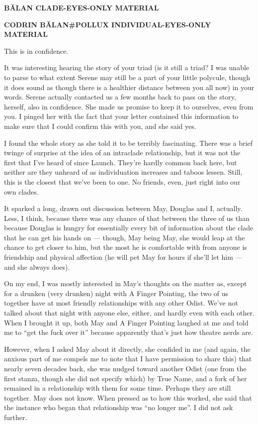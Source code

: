 \begin{center}
\textbf{BĂLAN CLADE-EYES-ONLY MATERIAL}
\end{center}

\begin{center}
\textbf{CODRIN BĂLAN\#POLLUX INDIVIDUAL-EYES-ONLY MATERIAL}
\end{center}

This is in confidence.

It was interesting hearing the story of your triad (is it still a triad? I was unable to parse to what extent Serene may still be a part of your little polycule, though it does sound as though there is a healthier distance between you all now) in your words. Serene actually contacted us a few months back to pass on the story, herself, also in confidence. She made us promise to keep it to ourselves, even from you. I pinged her with the fact that your letter contained this information to make sure that I could confirm this with you, and she said yes.

I found the whole story as she told it to be terribly fascinating. There was a brief twinge of surprise at the idea of an intraclade relationship, but it was not the first that I've heard of since Launch. They're hardly common back here, but neither are they unheard of as individuation increases and taboos lessen. Still, this is the closest that we've been to one. No friends, even, just right into our own clades.

It sparked a long, drawn out discussion between May, Douglas and I, actually. Less, I think, because there was any chance of that between the three of us than because Douglas is hungry for essentially every bit of information about the clade that he can get his hands on — though, May being May, she would leap at the chance to get closer to him, but the most he is comfortable with from anyone is friendship and physical affection (he will pet May for hours if she'll let him — and she always does).

On my end, I was mostly interested in May's thoughts on the matter as, except for a drunken (very drunken) night with A Finger Pointing, the two of us together have at most friendly relationships with any other Odist. We've not talked about that night with anyone else, either, and hardly even with each other. When I brought it up, both May and A Finger Pointing laughed at me and told me to ``get the fuck over it'' because apparently that's just how theatre nerds are.

However, when I asked May about it directly, she confided in me (and again, the anxious part of me compels me to note that I have permission to share this) that nearly seven decades back, she was nudged toward another Odist (one from the first stanza, though she did not specify which) by True Name, and a fork of her remained in a relationship with them for some time. Perhaps they are still together. May does not know. When pressed as to how this worked, she said that the instance who began that relationship was ``no longer me''. I did not ask further.

